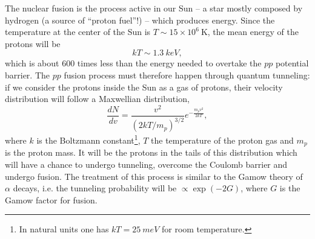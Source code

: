 The nuclear fusion is the process active in our Sun -- a star mostly composed by hydrogen (a source of ``proton fuel''!) -- which produces energy. Since the temperature at the center of the Sun is $T \sim 15 \times 10^6~\mbox{K}$, the mean energy of the protons will be 
\begin{equation*}
    kT \sim \SI{1.3}{keV},
\end{equation*}
which is about \(600\) times less than the energy needed to overtake the \(pp\) potential barrier. The \(pp\) fusion process must therefore happen through quantum tunneling: if we consider the protons inside the Sun as a gas of protons, their velocity distribution will follow a Maxwellian distribution,
\[
\frac{dN}{dv} = \frac{v^2}{\left(2kT/m_p\right)^{3/2}}e^{-\frac{m_pv^2}{2kT}},
\]
where \(k\) is the Boltzmann constant\footnote{In natural units one has \(kT=\SI{25}{meV}\) for room temperature.}, \(T\) the temperature of the proton gas and \(m_p\) is the proton mass.
It will be the protons in the tails of this distribution which will have a chance to undergo tunneling, overcome the Coulomb barrier and undergo fusion. The treatment of this process is similar to the Gamow theory of $\alpha$ decays, i.e. the tunneling probability will be \(\propto\exp(-2G)\), where \(G\) is the Gamow factor for fusion.

